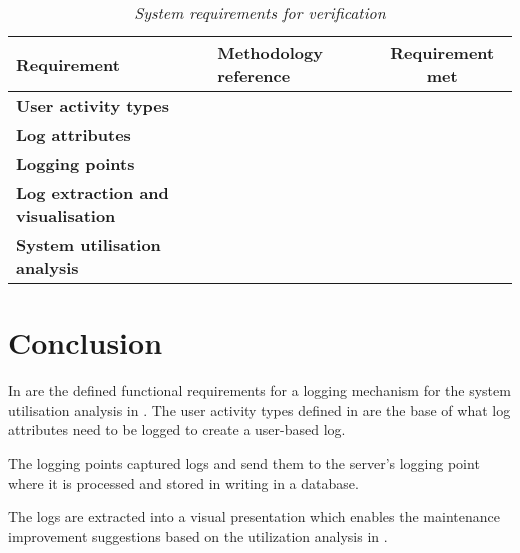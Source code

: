 \begin{table}[!htb]
	\centering
	\caption[System requirements for verification]
	{\textit{System requirements for verification}}
	\label{tbl:ch2_verification}
	\begin{tabularx}{\textwidth}{|X|l|c|}
		\hline \textbf{Requirement} & \textbf{Methodology reference} & \textbf{Requirement met} \\
		\hline \textbf{User activity types} & \Cref{sec:ch2_requirementsOfUAT,sec:ch2_userActivityTypes} & \cmark \\
		\hline \textbf{Log attributes} & \Cref{sec:ch2_logAttributes} & \cmark \\
		\hline \textbf{Logging points} & \Cref{sec:ch2_loggingPoints,sec:ch2_webApplicationArchitecture,sec:ch2_ElementObtaining,sec:ch2_serverSideLoggingpoint} & \cmark \\
		\hline \textbf{Log extraction and visualisation} & \Cref{sec:ch2_databaseStorage,sec:ch2_logExtraction} & \cmark \\
		\hline \textbf{System utilisation analysis} & \Cref{sec:ch2_utilisationImprovements} & \cmark \\
		\hline
	\end{tabularx}
\end{table}

\section{Conclusion}
In  are the defined functional requirements for a logging mechanism for the system utilisation analysis in . The user activity types defined in  are the base of what log attributes need to be logged to create a user-based log.\par The logging points captured logs and send them to the server's logging point where it is processed and stored in writing in a database.\par The logs are extracted into a visual presentation which enables the maintenance improvement suggestions based on the utilization analysis in .